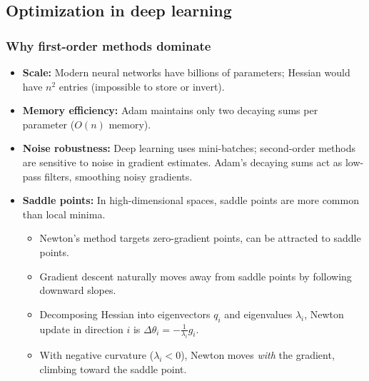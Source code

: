 \subsection*{Optimization in deep learning}

\subsubsection*{Why first-order methods dominate}
\begin{itemize}
    \item \textbf{Scale:} Modern neural networks have billions of parameters; Hessian would have $n^2$ entries (impossible to store or invert).
    \item \textbf{Memory efficiency:} Adam maintains only two decaying sums per parameter ($O(n)$ memory).
    \item \textbf{Noise robustness:} Deep learning uses mini-batches; second-order methods are sensitive to noise in gradient estimates. Adam's decaying sums act as low-pass filters, smoothing noisy gradients.
    \item \textbf{Saddle points:} In high-dimensional spaces, saddle points are more common than local minima.
    \begin{itemize}
        \item Newton's method targets zero-gradient points, can be attracted to saddle points.
        \item Gradient descent naturally moves away from saddle points by following downward slopes.
        \item Decomposing Hessian into eigenvectors $q_i$ and eigenvalues $\lambda_i$, Newton update in direction $i$ is $\Delta \theta_i = -\frac{1}{\lambda_i} g_i$.
        \item With negative curvature ($\lambda_i < 0$), Newton moves \textit{with} the gradient, climbing toward the saddle point.
    \end{itemize}
\end{itemize}
